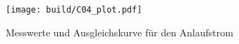 \begin{figure}[h]%
    \centering%
    \texttt{[image: build/C04\_plot.pdf]}%
    \caption{Messwerte und Ausgleichskurve für den Anlaufstrom}%
\end{figure}%